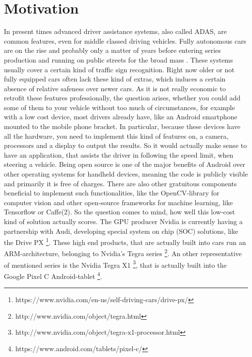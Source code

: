 
\chapter{Motivation}\label{chapter:motivation}
In present times advanced driver assistance systems, also called ADAS, are common features, even for middle classed driving vehicles. Fully autonomous cars are on the rise and probably only a matter of years before entering series production and running on public streets for the broad mass . These systems usually cover a certain kind of traffic sign recognition. Right now older or not fully equipped cars often lack these kind of extras, which induces a certain absence of relative safeness over newer cars. As it is not really economic to retrofit these features professionally, the question arises, whether you could add some of them to your vehicle without too much of circumstances, for example with a low cost device, most drivers already have, like an Android smartphone mounted to the mobile phone bracket. In particular, because these devices have all the hardware, you need to implement this kind of features on, a camera, processors and a display to output the results. So it would actually make sense to have an application, that assists the driver in following the speed limit, when steering a vehicle. \newline
Being open source is one of the major benefits of Android over other operating systems for handheld devices, meaning the code is publicly visible and primarily it is free of charges. There are also other gratuitous components beneficial to implement such functionalities, like the OpenCV-library for computer vision and other open-source frameworks for machine learning, like Tensorflow or Caffe(2). So the question comes to mind, how well this low-cost kind of solution actually scores.\newline
The GPU producer Nvidia is currently having a partnership with Audi, developing special system on  chip (SOC) solutions, like the Drive PX \footnote{https://www.nvidia.com/en-us/self-driving-cars/drive-px/}. These high end products, that are actually built into cars run an ARM-architecture,  belonging to Nvidia's Tegra series \footnote{http://www.nvidia.com/object/tegra.html}. An other representative of mentioned series is the Nvidia Tegra X1 \footnote{http://www.nvidia.com/object/tegra-x1-processor.html}, that is actually built into the Google Pixel C Android-tablet \footnote{https://www.android.com/tablets/pixel-c/}. 

